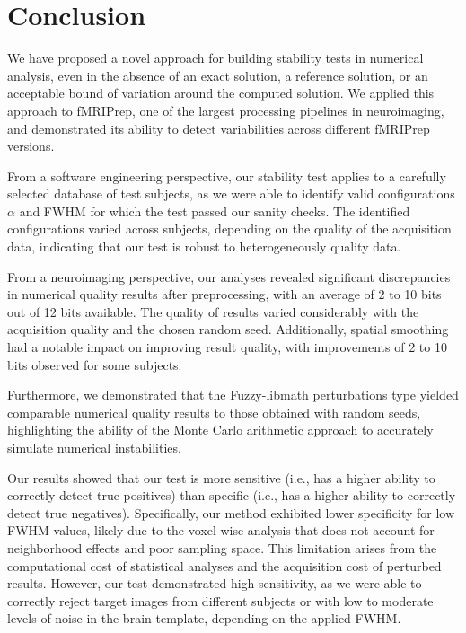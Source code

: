\documentclass[lettersize,journal]{IEEEtran}
\newcommand{\fmriprep}{fMRIPrep\xspace}
\begin{document}
\section{Conclusion}

We have proposed a novel approach for building stability tests in numerical analysis, even in the absence of an exact solution, a reference solution, or an acceptable bound of variation around the computed solution. We applied this approach to \fmriprep, one of the largest processing pipelines in neuroimaging, and demonstrated its ability to detect variabilities across different \fmriprep versions.

From a software engineering perspective, our stability test applies to a carefully selected database of test subjects, as we were able to identify valid configurations $\alpha$ and FWHM for which the test passed our sanity checks. The identified configurations varied across subjects, depending on the quality of the acquisition data, indicating that our test is robust to heterogeneously quality data.

From a neuroimaging perspective, our analyses revealed significant discrepancies in numerical quality results after preprocessing, with an average of 2 to 10 bits out of 12 bits available. The quality of results varied considerably with the acquisition quality and the chosen random seed. Additionally, spatial smoothing had a notable impact on improving result quality, with improvements of 2 to 10 bits observed for some subjects.

Furthermore, we demonstrated that the Fuzzy-libmath perturbations type yielded comparable numerical quality results to those obtained with random seeds, highlighting the ability of the Monte Carlo arithmetic approach to accurately simulate numerical instabilities.

Our results showed that our test is more sensitive (i.e., has a higher ability to correctly detect true positives) than specific (i.e., has a higher ability to correctly detect true negatives). Specifically, our method exhibited lower specificity for low FWHM values, likely due to the voxel-wise analysis that does not account for neighborhood effects and poor sampling space. This limitation arises from the computational cost of statistical analyses and the acquisition cost of perturbed results. However, our test demonstrated high sensitivity, as we were able to correctly reject target images from different subjects or with low to moderate levels of noise in the brain template, depending on the applied FWHM.
\end{document}
